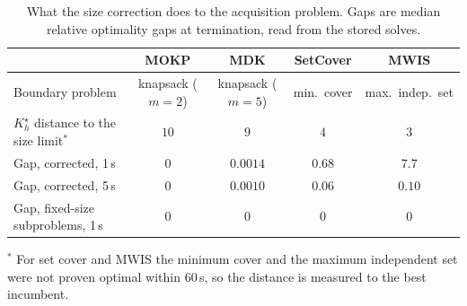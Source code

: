 \begin{table}[h]\centering\small
\caption{What the size correction does to the acquisition problem. Gaps are median relative optimality gaps at termination, read from the stored solves.}
\label{tab:edge}
\begin{tabular}{lcccc}
\toprule
 & MOKP & MDK & SetCover & MWIS \\
\midrule
Boundary problem                    & knapsack ($m{=}2$) & knapsack ($m{=}5$) & min.\ cover & max.\ indep.\ set \\
$K^\star_h$ distance to the size limit$^\ast$ & $10$ & $9$ & $4$ & $3$ \\
Gap, corrected, 1\,s              & $0$ & $0.0014$ & $0.68$ & $7.7$ \\
Gap, corrected, 5\,s              & $0$ & $0.0010$ & $0.06$ & $0.10$ \\
Gap, fixed-size subproblems, 1\,s    & $0$ & $0$ & $0$ & $0$ \\
\bottomrule
\end{tabular}

{\small $^\ast$ For set cover and MWIS the minimum cover and the maximum independent set were not proven optimal within $60$\,s, so the distance is measured to the best incumbent.}

\end{table}
